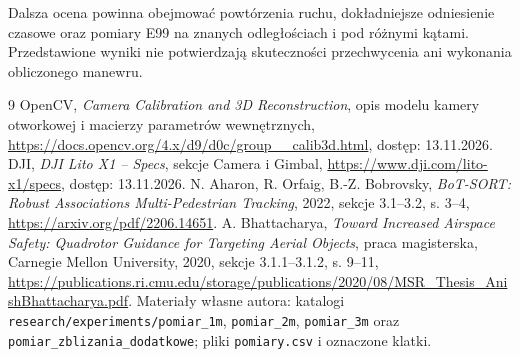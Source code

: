\documentclass[12pt,a4paper]{article}
\begin{document}
Dalsza ocena powinna obejmować powtórzenia ruchu, dokładniejsze odniesienie czasowe oraz pomiary E99 na znanych odległościach i pod różnymi kątami. Przedstawione wyniki nie potwierdzają skuteczności przechwycenia ani wykonania obliczonego manewru.

\begin{thebibliography}{9}
 OpenCV, \emph{Camera Calibration and 3D Reconstruction}, opis modelu kamery otworkowej i macierzy parametrów wewnętrznych, \url{https://docs.opencv.org/4.x/d9/d0c/group__calib3d.html}, dostęp: 13.11.2026.
 DJI, \emph{DJI Lito X1 -- Specs}, sekcje Camera i Gimbal, \url{https://www.dji.com/lito-x1/specs}, dostęp: 13.11.2026.
 N. Aharon, R. Orfaig, B.-Z. Bobrovsky, \emph{BoT-SORT: Robust Associations Multi-Pedestrian Tracking}, 2022, sekcje 3.1--3.2, s. 3--4, \url{https://arxiv.org/pdf/2206.14651}.
 A. Bhattacharya, \emph{Toward Increased Airspace Safety: Quadrotor Guidance for Targeting Aerial Objects}, praca magisterska, Carnegie Mellon University, 2020, sekcje 3.1.1--3.1.2, s. 9--11, \url{https://publications.ri.cmu.edu/storage/publications/2020/08/MSR_Thesis_AnishBhattacharya.pdf}.
 Materiały własne autora: katalogi \texttt{research/experiments/pomiar\_1m}, \texttt{pomiar\_2m}, \texttt{pomiar\_3m} oraz \texttt{pomiar\_zblizania\_dodatkowe}; pliki \texttt{pomiary.csv} i oznaczone klatki.
\end{thebibliography}
\end{document}
